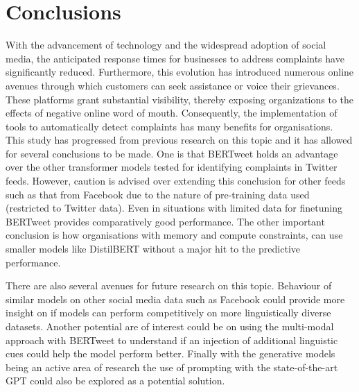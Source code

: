 \chapter{Conclusions}

With the advancement of technology and the widespread adoption of social media, the anticipated response times for businesses to address complaints have significantly reduced. Furthermore, this evolution has introduced numerous online avenues through which customers can seek assistance or voice their grievances. These platforms grant substantial visibility, thereby exposing organizations to the effects of negative online word of mouth. Consequently, the implementation of tools to automatically detect complaints has many benefits for organisations.\\

This study has progressed from previous research on this topic and it has allowed for several conclusions to be made. One is that BERTweet holds an advantage over the other transformer models tested for identifying complaints in Twitter feeds. However, caution is advised over extending this conclusion for other feeds such as that from Facebook due to the nature of pre-training data used (restricted to Twitter data). Even in situations with limited data for finetuning BERTweet provides comparatively good performance. The other important conclusion is how organisations with memory and compute constraints, can use smaller models like DistilBERT without a major hit to the predictive performance. 

There are also several avenues for future research on this topic. Behaviour of similar models on other social media data such as Facebook could provide more insight on if models can perform competitively on more linguistically diverse datasets. Another potential are of interest could be on using the multi-modal approach with BERTweet to understand if an injection of additional linguistic cues could help the model perform better. Finally with the generative models being an active area of research the use of prompting with the state-of-the-art GPT could also be explored as a potential solution.
